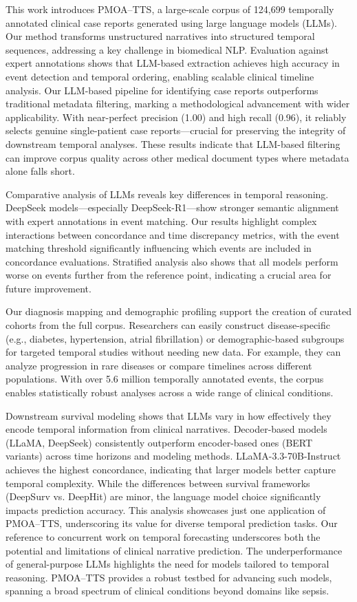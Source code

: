 \vspace{-2mm}
This work introduces PMOA–TTS, a large-scale corpus of 124,699 temporally annotated clinical case reports generated using large language models (LLMs). Our method transforms unstructured narratives into structured temporal sequences, addressing a key challenge in biomedical NLP. Evaluation against expert annotations shows that LLM-based extraction achieves high accuracy in event detection and temporal ordering, enabling scalable clinical timeline analysis. Our LLM-based pipeline for identifying case reports outperforms traditional metadata filtering, marking a methodological advancement with wider applicability. With near-perfect precision (1.00) and high recall (0.96), it reliably selects genuine single-patient case reports—crucial for preserving the integrity of downstream temporal analyses. These results indicate that LLM-based filtering can improve corpus quality across other medical document types where metadata alone falls short.

Comparative analysis of LLMs reveals key differences in temporal reasoning. DeepSeek models—especially DeepSeek-R1—show stronger semantic alignment with expert annotations in event matching. Our results highlight complex interactions between concordance and time discrepancy metrics, with the event matching threshold significantly influencing which events are included in concordance evaluations. Stratified analysis also shows that all models perform worse on events further from the reference point, indicating a crucial area for future improvement.

Our diagnosis mapping and demographic profiling support the creation of curated cohorts from the full corpus. Researchers can easily construct disease-specific (e.g., diabetes, hypertension, atrial fibrillation) or demographic-based subgroups for targeted temporal studies without needing new data. For example, they can analyze progression in rare diseases or compare timelines across different populations. With over 5.6 million temporally annotated events, the corpus enables statistically robust analyses across a wide range of clinical conditions.

Downstream survival modeling shows that LLMs vary in how effectively they encode temporal information from clinical narratives. Decoder-based models (LLaMA, DeepSeek) consistently outperform encoder-based ones (BERT variants) across time horizons and modeling methods. LLaMA-3.3-70B-Instruct achieves the highest concordance, indicating that larger models better capture temporal complexity. While the differences between survival frameworks (DeepSurv vs. DeepHit) are minor, the language model choice significantly impacts prediction accuracy. This analysis showcases just one application of PMOA–TTS, underscoring its value for diverse temporal prediction tasks. Our reference to concurrent work \citep{noroozizadeh2025forecasting} on temporal forecasting underscores both the potential and limitations of clinical narrative prediction. The underperformance of general-purpose LLMs highlights the need for models tailored to temporal reasoning. PMOA–TTS provides a robust testbed for advancing such models, spanning a broad spectrum of clinical conditions beyond domains like sepsis. 

